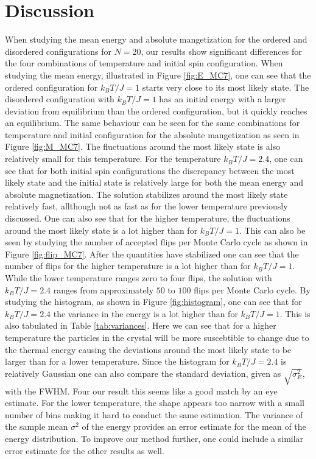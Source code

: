\documentclass[twocolumn]{aastex62}
\begin{document}
\section{Discussion} \label{sec:discussion}
When studying the mean energy and absolute mangetization for the ordered and
disordered configurations for $N=20$, our results show significant differences
for the four combinations of temperature and initial spin configuration. When
studying the mean energy, illustrated in Figure \ref{fig:E_MC7}, one can see
that the ordered configuration for $k_BT/J=1$ starts very close to its most
likely state. The disordered configuration with $k_BT/J=1$ has an initial energy
with a larger deviation from equilibrium than the ordered configuration, but it quickly reaches an
equilibrium. The same behaviour can be seen for the same combinations for
temperature and initial configuration for the absolute mangetization as seen in
Figure \ref{fig:M_MC7}. The fluctuations around the most likely state is also
relatively small for this temperature. For the temperature $k_BT/J=2.4$, one can
see that for both initial spin configurations the discrepancy between
the most likely state and the initial state is relatively large for both the
mean energy and absolute magnetization. The solution stabilizes around the most
likely state relatively fast, allthough not as fast as for the lower temperature
previously discussed. One can also see that for the higher temperature, the
fluctuations around the most likely state is a lot higher than for $k_BT/J =1$.
This can also be seen by studying the number of accepted flips per Monte Carlo
cycle as shown in Figure \ref{fig:flip_MC7}. After the quantities have
stabilized one can see that the number of flips for the higher temperature is a
lot higher than for $k_BT/J=1$. While the lower temperature ranges zero to four
flips, the solution with $k_BT/J=2.4$ ranges from approximately $50$ to $100$
flips per Monte Carlo cycle. By studying the histogram, as shown in Figure
\ref{fig:histogram}, one can see that for $k_BT/J=2.4$ the variance in the
energy is a lot higher than for $k_BT/J=1$. This is also tabulated in Table
\ref{tab:variances}. Here we can see that for a higher temperature the particles
in the crystal will be more suscebtible to change due to the thermal energy causing the deviations
around the most likely state to be larger than for a lower temperature. Since
the histogram for $k_BT/J=2.4$ is relatively Gaussian one can also compare the
standard deviation, given as $\sqrt{\sigma_E^2}$, with the FWHM. Four our result
this seems like a good match by an eye estimate. For the lower temperature, the
shape appears too narrow with a small number of bins making it hard to conduct
the same estimation. The variance of the sample mean $\sigma^2$ of the energy
provides an error estimate for the mean of the energy distribution. To improve
our method further, one could include a similar error estimate for the other
results as well.\\\indent
\end{document}

